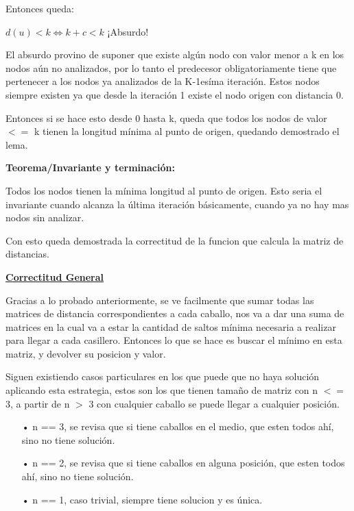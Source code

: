 \documentclass[10pt,a4paper]{article}
\begin{document}
\bigskip
Entonces queda:

\begin{center}
 $d(u) < k \Longleftrightarrow k + c < k$ ¡Absurdo!
\end{center}

\bigskip
El absurdo provino de suponer que existe algún nodo con valor menor a k en los nodos aún no analizados, por lo tanto el predecesor obligatoriamente tiene que pertenecer a los nodos ya analizados de la K-1esíma iteración. Estos nodos siempre existen ya que desde la iteración 1 existe el nodo origen con distancia 0.

Entonces si se hace esto desde 0 hasta k, queda que todos los nodos de valor $<=$ k tienen la longitud mínima al punto de origen, quedando demostrado el lema.

\newpage
\textbf{Teorema/Invariante y terminación:}

Todos los nodos tienen la mínima longitud al punto de origen. Esto seria el invariante cuando alcanza la última iteración básicamente, cuando ya no hay mas nodos sin analizar.

Con esto queda demostrada la correctitud de la funcion que calcula la matriz de distancias.

\bigskip
\noindent \underline{\textbf{Correctitud General}}

Gracias a lo probado anteriormente, se ve facilmente que sumar todas las matrices de distancia correspondientes a cada caballo, nos va a dar una suma de matrices en la cual va a estar la cantidad de saltos mínima necesaria a realizar para llegar a cada casillero. Entonces lo que se hace es buscar el mínimo en esta matriz, y devolver su posicion y valor.

Siguen existiendo casos particulares en los que puede que no haya solución aplicando esta estrategia, estos son los que tienen tamaño de matriz con n $<=$ 3, a partir de n $>$ 3 con cualquier caballo se puede llegar a cualquier posición.

\begin{enumerate}
\item[•] n == 3, se revisa que si tiene caballos en el medio, que esten todos ahí, sino no tiene solución.
\item[•] n == 2, se revisa que si tiene caballos en alguna posición, que esten todos ahí, sino no tiene solución.
\item[•] n == 1, caso trivial, siempre tiene solucion y es única.
\end{enumerate}
\end{document}
